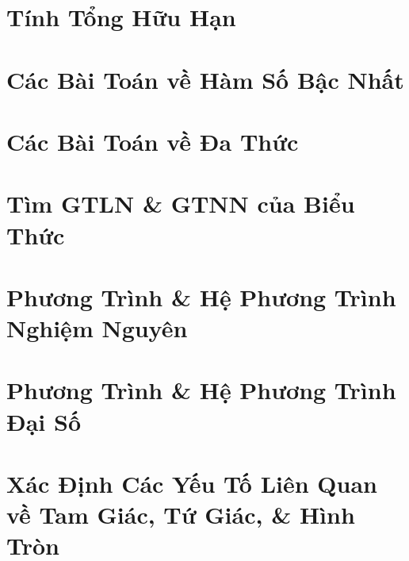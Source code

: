 \documentclass{article}
\begin{document}

\section{Tính Tổng Hữu Hạn}


\section{Các Bài Toán về Hàm Số Bậc Nhất}


\section{Các Bài Toán về Đa Thức}


\section{Tìm GTLN \& GTNN của Biểu Thức}


\section{Phương Trình \& Hệ Phương Trình Nghiệm Nguyên}


\section{Phương Trình \& Hệ Phương Trình Đại Số}


\section{Xác Định Các Yếu Tố Liên Quan về Tam Giác, Tứ Giác, \& Hình Tròn}

\end{document}

